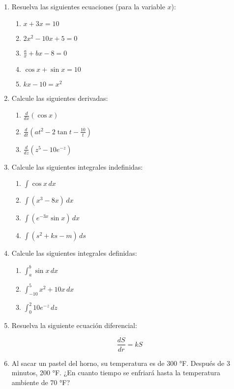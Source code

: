 \begin{enumerate}
\item Resuelva las siguientes ecuaciones (para la variable $x$):
\begin{enumerate}
  \item $ x + 3x = 10 $
  \item $ 2x^2 - 10x + 5 = 0 $
  \item $ \frac{a}{x} + bx - 8 = 0 $
  \item $ \cos x + \sin x = 10 $
  \item $ kx - 10 = x^2 $
\end{enumerate}

\item Calcule las siguientes derivadas:
\begin{enumerate}
  \item $ \frac{d}{dx} \left( \cos x \right) $
  \item $ \frac{d}{dt} \left( at^2 - 2\tan t - \frac{10}{t} \right) $
  \item $ \frac{d}{dz} \left( z^5 - 10 e^{-z}  \right) $
\end{enumerate}

\item Calcule las siguientes integrales indefinidas:

\begin{enumerate}
  \item $ \int \cos x \, dx $
  \item $ \int \left( x^3 - 8x \right)\, dx $
  \item $ \int \left( e^{-3x} \sin x \right) \, dx $
  \item $ \int \left( s^2 + ks - m \right) \, ds $
\end{enumerate}

\item Calcule las siguientes integrales definidas:

\begin{enumerate}
  \item $ \int_{a}^{b} \sin x \, dx $
  \item $ \int_{-10}^{5} x^2 + 10x \, dx $
  \item $ \int_{0}^{2} 10e^{-z} \, dz  $
\end{enumerate}


\item Resuelva la siguiente ecuación diferencial:

$$ \frac{dS}{dr} = kS $$

\item Al sacar un pastel del horno, su temperatura es de 300 °F. Después de 3 minutos, 200 °F. 
¿En cuanto tiempo se enfriará hasta la temperatura ambiente de 70 °F?


\end{enumerate}
